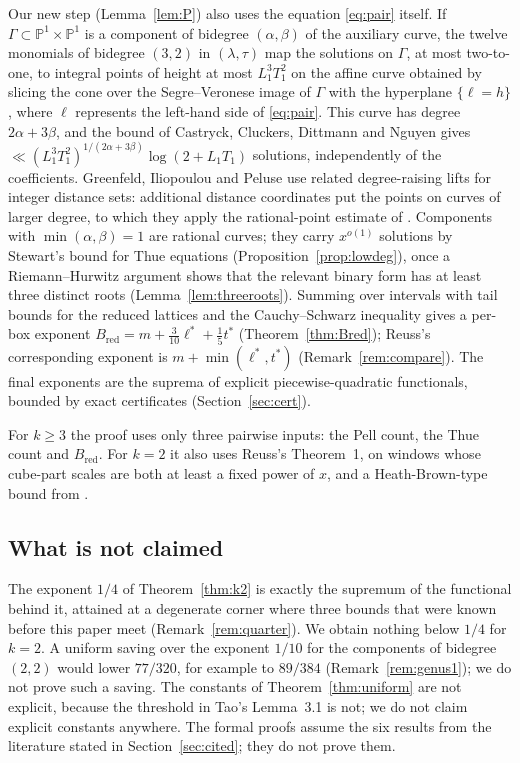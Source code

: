 \documentclass[11pt,reqno]{amsart}
\theoremstyle{definition}
\theoremstyle{remark}
\numberwithin{equation}{section}
\newcommand{\PP}{\mathbb P}
\newcommand{\Bred}{B_{\mathrm{red}}}
\newcommand{\lst}{\ell^{*}}
\newcommand{\tst}{t^{*}}
\begin{document}
Our new step (Lemma~\ref{lem:P}) also uses the equation \eqref{eq:pair} itself.
If $\Gamma\subset\PP^1\times\PP^1$ is a component of bidegree $(\alpha,\beta)$ of
the auxiliary curve, the twelve monomials of bidegree $(3,2)$ in
$(\lambda,\tau)$ map the solutions on $\Gamma$, at most two-to-one, to
integral points of height at most $L_1^3T_1^2$ on the affine curve obtained by
slicing the cone over the Segre--Veronese image of $\Gamma$ with the
hyperplane $\{\ell=h\}$, where $\ell$ represents the left-hand side of
\eqref{eq:pair}. This curve has degree $2\alpha+3\beta$, and the bound of
Castryck, Cluckers, Dittmann and Nguyen \cite{CCDN} gives
$\ll(L_1^3T_1^2)^{1/(2\alpha+3\beta)}\log(2+L_1T_1)$ solutions, independently of
the coefficients. Greenfeld, Iliopoulou and Peluse
\cite[Sections~1.4 and~2.3]{GIP} use related degree-raising lifts for integer
distance sets: additional distance coordinates put the points on curves of
larger degree, to which they apply the rational-point estimate of \cite{CCDN}.
Components with $\min(\alpha,\beta)=1$ are rational curves;
they carry $x^{o(1)}$ solutions by Stewart's bound for Thue equations
\cite{Stewart} (Proposition~\ref{prop:lowdeg}), once a Riemann--Hurwitz argument
shows that the relevant binary form has at least three distinct roots
(Lemma~\ref{lem:threeroots}). Summing over intervals with tail bounds for the
reduced lattices and the Cauchy--Schwarz inequality gives a per-box exponent
$\Bred=m+\tfrac3{10}\lst+\tfrac15\tst$ (Theorem~\ref{thm:Bred}); Reuss's
corresponding exponent is $m+\min(\lst,\tst)$ (Remark~\ref{rem:compare}). The
final exponents are the suprema of explicit piecewise-quadratic functionals,
bounded by exact certificates (Section~\ref{sec:cert}).

For $k\ge3$ the proof uses only three pairwise inputs: the Pell count, the Thue
count and $\Bred$. For $k=2$ it also uses Reuss's Theorem~1, on windows whose
cube-part scales are both at least a fixed power of $x$, and a
Heath-Brown-type bound from \cite[\S5]{Reuss}.

\subsection{What is not claimed}
The exponent $1/4$ of Theorem~\ref{thm:k2} is exactly the supremum of the
functional behind it, attained at a degenerate corner where three bounds that
were known before this paper meet (Remark~\ref{rem:quarter}). We obtain
nothing below $1/4$ for $k=2$. A uniform saving over the exponent $1/10$ for the
components of bidegree $(2,2)$ would lower $77/320$, for example to $89/384$
(Remark~\ref{rem:genus1}); we do not prove such a saving. The constants of
Theorem~\ref{thm:uniform} are not explicit, because the threshold in Tao's
Lemma~3.1 is not; we do not
claim explicit constants anywhere. The formal proofs assume the six results from the
literature stated in Section~\ref{sec:cited}; they do not prove them.
\end{document}
